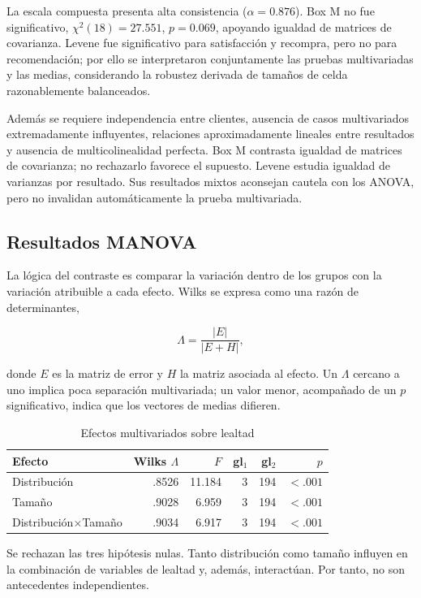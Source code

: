 \documentclass[11pt,letterpaper]{article}
\begin{document}
La escala compuesta presenta alta consistencia ($\alpha=0.876$). Box M no fue significativo, $\chi^2(18)=27.551$, $p=0.069$, apoyando igualdad de matrices de covarianza. Levene fue significativo para satisfacción y recompra, pero no para recomendación; por ello se interpretaron conjuntamente las pruebas multivariadas y las medias, considerando la robustez derivada de tamaños de celda razonablemente balanceados.

Además se requiere independencia entre clientes, ausencia de casos multivariados extremadamente influyentes, relaciones aproximadamente lineales entre resultados y ausencia de multicolinealidad perfecta. Box M contrasta igualdad de matrices de covarianza; no rechazarlo favorece el supuesto. Levene estudia igualdad de varianzas por resultado. Sus resultados mixtos aconsejan cautela con los ANOVA, pero no invalidan automáticamente la prueba multivariada.

\subsection{Resultados MANOVA}

La lógica del contraste es comparar la variación dentro de los grupos con la variación atribuible a cada efecto. Wilks se expresa como una razón de determinantes,

\[
\Lambda=\frac{|E|}{|E+H|},
\]

donde $E$ es la matriz de error y $H$ la matriz asociada al efecto. Un $\Lambda$ cercano a uno implica poca separación multivariada; un valor menor, acompañado de un $p$ significativo, indica que los vectores de medias difieren.

\begin{table}[H]
\centering
\caption{Efectos multivariados sobre lealtad}
\begin{tabular}{lrrrrr}
\toprule
Efecto & Wilks $\Lambda$ & $F$ & gl$_1$ & gl$_2$ & $p$\\
\midrule
Distribución & .8526 & 11.184 & 3 & 194 & $<.001$\\
Tamaño & .9028 & 6.959 & 3 & 194 & $<.001$\\
Distribución$\times$Tamaño & .9034 & 6.917 & 3 & 194 & $<.001$\\
\bottomrule
\end{tabular}
\end{table}

Se rechazan las tres hipótesis nulas. Tanto distribución como tamaño influyen en la combinación de variables de lealtad y, además, interactúan. Por tanto, no son antecedentes independientes.
\end{document}
